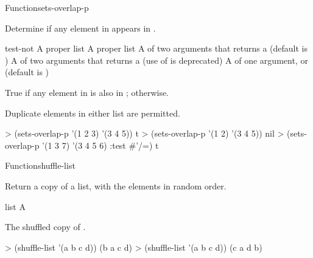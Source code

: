 \documentclass[10pt,twoside,english,pdftex]{article}
\begin{document}
\begin{functiondoc}{Function}{sets-overlap-p}{
      \returns{} }

\fnsyntax

\fnpurpose Determine if any element in  appears in 
.

\fnpackage {}

\fnmodule {}

\fnargs
\begin{args}{test-not}
\arg[list-1] A proper list
\arg[list-2] A proper list
\arg[test] A  of two arguments that returns a
 (default is ) 
 A  of two arguments that returns a
 (use of  is deprecated)
\arg[key] A  of one argument, or \nil{} (default is \nil)
\end{args}

\fnreturns True if any element in  is also in
; \nil{} otherwise.

\fndescription Duplicate elements in either list are permitted.

\fnexamples
\begin{example}
> (sets-overlap-p '(1 2 3) '(3 4 5))
t
> (sets-overlap-p '(1 2) '(3 4 5))
nil
> (sets-overlap-p '(1 3 7) '(3 4 5 6) :test #'/=)
t
\end{example}

\end{functiondoc}


\begin{functiondoc}{Function}{shuffle-list}{
  \returns{} }
%

\fnsyntax

\fnpurpose Return a copy of a list, with the elements in random order.

\fnpackage {}

\fnmodule {}

\fnargs
\begin{args}{list}
\arg[list] A 
\end{args}

\fnreturns The shuffled copy of .

\fnexamples
\begin{example}
> (shuffle-list '(a b c d))
(b a c d)
> (shuffle-list '(a b c d))
(c a d b)
\end{example}

\end{functiondoc}
\end{document}
